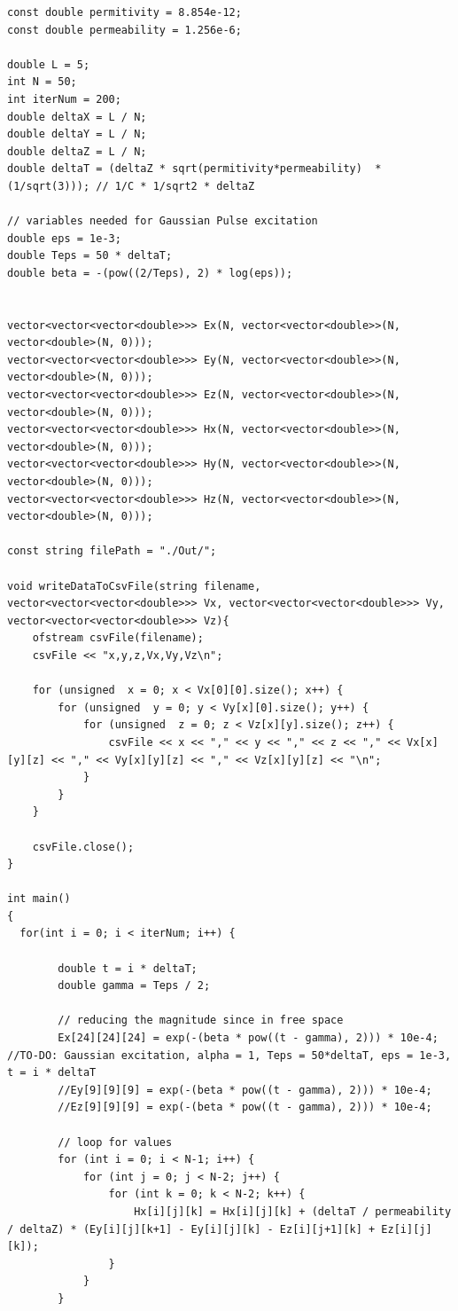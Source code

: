 \begin{verbatim}
const double permitivity = 8.854e-12;
const double permeability = 1.256e-6;

double L = 5;
int N = 50;
int iterNum = 200;
double deltaX = L / N;
double deltaY = L / N;
double deltaZ = L / N;
double deltaT = (deltaZ * sqrt(permitivity*permeability)  * (1/sqrt(3))); // 1/C * 1/sqrt2 * deltaZ

// variables needed for Gaussian Pulse excitation
double eps = 1e-3;
double Teps = 50 * deltaT;
double beta = -(pow((2/Teps), 2) * log(eps));


vector<vector<vector<double>>> Ex(N, vector<vector<double>>(N, vector<double>(N, 0)));
vector<vector<vector<double>>> Ey(N, vector<vector<double>>(N, vector<double>(N, 0)));
vector<vector<vector<double>>> Ez(N, vector<vector<double>>(N, vector<double>(N, 0)));
vector<vector<vector<double>>> Hx(N, vector<vector<double>>(N, vector<double>(N, 0)));
vector<vector<vector<double>>> Hy(N, vector<vector<double>>(N, vector<double>(N, 0)));
vector<vector<vector<double>>> Hz(N, vector<vector<double>>(N, vector<double>(N, 0)));

const string filePath = "./Out/";

void writeDataToCsvFile(string filename, vector<vector<vector<double>>> Vx, vector<vector<vector<double>>> Vy, vector<vector<vector<double>>> Vz){
	ofstream csvFile(filename);
	csvFile << "x,y,z,Vx,Vy,Vz\n";
	
	for (unsigned  x = 0; x < Vx[0][0].size(); x++) {
		for (unsigned  y = 0; y < Vy[x][0].size(); y++) {
			for (unsigned  z = 0; z < Vz[x][y].size(); z++) {
				csvFile << x << "," << y << "," << z << "," << Vx[x][y][z] << "," << Vy[x][y][z] << "," << Vz[x][y][z] << "\n";
			}
		}
	}
	
	csvFile.close();
}

int main()
{
  for(int i = 0; i < iterNum; i++) {
		
		double t = i * deltaT;
		double gamma = Teps / 2;
		
		// reducing the magnitude since in free space
		Ex[24][24][24] = exp(-(beta * pow((t - gamma), 2))) * 10e-4;  //TO-DO: Gaussian excitation, alpha = 1, Teps = 50*deltaT, eps = 1e-3, t = i * deltaT
		//Ey[9][9][9] = exp(-(beta * pow((t - gamma), 2))) * 10e-4;
		//Ez[9][9][9] = exp(-(beta * pow((t - gamma), 2))) * 10e-4;
		
		// loop for values
		for (int i = 0; i < N-1; i++) {
			for (int j = 0; j < N-2; j++) {
				for (int k = 0; k < N-2; k++) {
					Hx[i][j][k] = Hx[i][j][k] + (deltaT / permeability / deltaZ) * (Ey[i][j][k+1] - Ey[i][j][k] - Ez[i][j+1][k] + Ez[i][j][k]);
				}
			}
		}
		

\end{verbatim}
